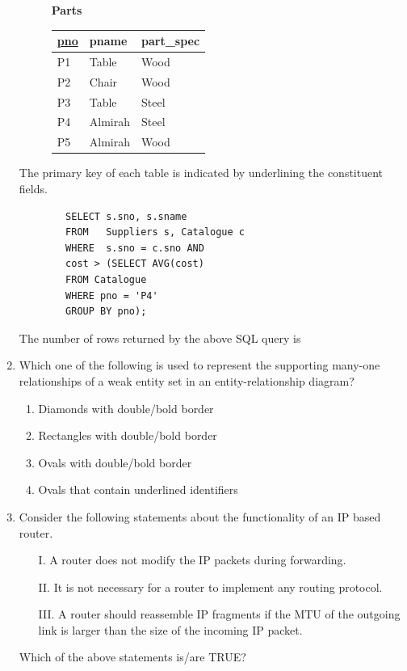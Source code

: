 \documentclass[journal,12pt,onecolumn]{IEEEtran}
\theoremstyle{remark}
\begin{document}
\begin{enumerate}
\begin{figure}[H]
\begin{minipage}{0.45\linewidth}
			\textbf{Parts}
			\begin{tabular}{|l|l|l|}
				\hline
				\underline{pno} & pname & part\_spec \\ \hline
				P1 & Table & Wood \\
				P2 & Chair & Wood \\
				P3 & Table & Steel \\
				P4 & Almirah & Steel \\
				P5 & Almirah & Wood \\ \hline
			\end{tabular}
		\end{minipage}
		\caption*{}
		\label{fig:q13_tables}
	\end{figure}
	The primary key of each table is indicated by underlining the constituent fields.
	\begin{verbatim}
		SELECT s.sno, s.sname
		FROM   Suppliers s, Catalogue c
		WHERE  s.sno = c.sno AND
		cost > (SELECT AVG(cost)
		FROM Catalogue
		WHERE pno = 'P4'
		GROUP BY pno);
	\end{verbatim}
	The number of rows returned by the above SQL query is
	\hfill{}
	\begin{enumerate}
	\end{enumerate}
	\item Which one of the following is used to represent the supporting many-one relationships of a weak entity set in an entity-relationship diagram?
	
	\hfill{\brak{\text{GATE CS 2020}}}
	\begin{enumerate}
		\item Diamonds with double/bold border
		\item Rectangles with double/bold border
		\item Ovals with double/bold border
		\item Ovals that contain underlined identifiers
	\end{enumerate}
	
	\item Consider the following statements about the functionality of an IP based router.
	\begin{enumerate}
		\item[I.] A router does not modify the IP packets during forwarding.
		\item[II.] It is not necessary for a router to implement any routing protocol.
		\item[III.] A router should reassemble IP fragments if the MTU of the outgoing link is larger than the size of the incoming IP packet.
	\end{enumerate}
	Which of the above statements is/are TRUE?
	

\end{enumerate}
\end{document}
